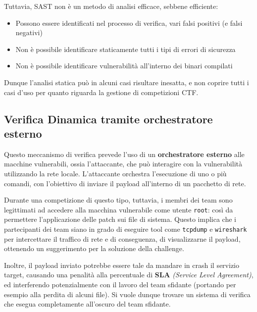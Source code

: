Tuttavia, SAST non è un metodo di analisi efficace, sebbene efficiente:

\begin{itemize}
\tightlist
\item
  Possono essere identificati nel processo di verifica, vari falsi
  positivi (e falsi negativi)
\item
  Non è possibile identificare staticamente tutti i tipi di errori di
  sicurezza 
\item
  Non è possibile identificare vulnerabilità all'interno dei binari
  compilati
\end{itemize}

Dunque l'analisi statica può in alcuni casi risultare inesatta, e non
coprire tutti i casi d'uso per quanto riguarda la gestione di
competizioni CTF.

\subsection{Verifica Dinamica tramite orchestratore
esterno}\label{verifica-dinamica-tramite-orchestratore-esterno}

Questo meccanismo di verifica prevede l'uso di un \textbf{orchestratore
esterno} alle macchine vulnerabili, ossia l'attaccante, che può
interagire con la vulnerabilità utilizzando la rete locale. L'attaccante
orchestra l'esecuzione di uno o più comandi, con l'obiettivo di inviare
il payload all'interno di un pacchetto di rete.

Durante una competizione di questo tipo, tuttavia, i membri dei team
sono legittimati ad accedere alla macchina vulnerabile come utente
\passthrough{\lstinline!root!}: così da permettere l'applicazione delle
patch sui file di sistema. Questo implica che i partecipanti dei team
siano in grado di eseguire tool come \passthrough{\lstinline!tcpdump!} e
\passthrough{\lstinline!wireshark!} per intercettare il traffico di rete
e di conseguenza, di visualizzarne il payload, ottenendo un suggerimento
per la soluzione della challenge.

Inoltre, il payload inviato potrebbe essere tale da mandare in crash il
servizio target, causando una penalità alla percentuale di \textbf{SLA}
\emph{(Service Level Agreement)}, ed interferendo potenzialmente con il
lavoro del team sfidante (portando per esempio alla perdita di alcuni
file). Si vuole dunque trovare un sistema di verifica che esegua
completamente all'oscuro del team sfidante.


